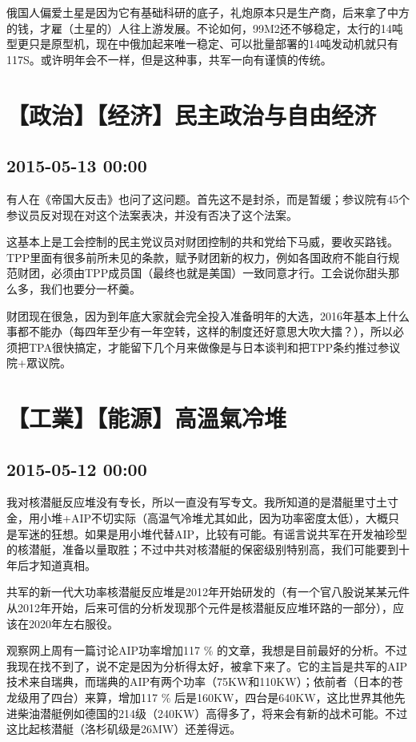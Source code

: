\documentclass[twocolumn]{ctexart}
\begin{document}
俄国人偏爱土星是因为它有基础科研的底子，礼炮原本只是生产商，后来拿了中方的钱，才雇（土星的）人往上游发展。不论如何，99M2还不够稳定，太行的14吨型更只是原型机，现在中俄加起来唯一稳定、可以批量部署的14吨发动机就只有117S。或许明年会不一样，但是这种事，共军一向有谨慎的传统。\section*{【政治】【经济】民主政治与自由经济}
\subsection*{2015-05-13 00:00}
有人在《帝国大反击》也问了这问题。首先这不是封杀，而是暂缓；参议院有45个参议员反对现在对这个法案表决，并没有否决了这个法案。

这基本上是工会控制的民主党议员对财团控制的共和党给下马威，要收买路钱。TPP里面有很多前所未见的条款，赋予财团新的权力，例如各国政府不能自行规范财团，必须由TPP成员国（最终也就是美国）一致同意才行。工会说你甜头那么多，我们也要分一杯羹。

财团现在很急，因为到年底大家就会完全投入准备明年的大选，2016年基本上什么事都不能办（每四年至少有一年空转，这样的制度还好意思大吹大擂？），所以必须把TPA很快搞定，才能留下几个月来做像是与日本谈判和把TPP条约推过参议院+眾议院。\section*{【工業】【能源】高溫氣冷堆}
\subsection*{2015-05-12 00:00}
我对核潜艇反应堆没有专长，所以一直没有写专文。我所知道的是潜艇里寸土寸金，用小堆+AIP不切实际（高温气冷堆尤其如此，因为功率密度太低），大概只是军迷的狂想。如果是用小堆代替AIP，比较有可能。有谣言说共军在开发袖珍型的核潜艇，准备以量取胜；不过中共对核潜艇的保密级别特别高，我们可能要到十年后才知道真相。

共军的新一代大功率核潜艇反应堆是2012年开始研发的（有一个官八股说某某元件从2012年开始，后来可信的分析发现那个元件是核潜艇反应堆环路的一部分），应该在2020年左右服役。

观察网上周有一篇讨论AIP功率增加117 \% 的文章，我想是目前最好的分析。不过我现在找不到了，说不定是因为分析得太好，被拿下来了。它的主旨是共军的AIP技术来自瑞典，而瑞典的AIP有两个功率（75KW和110KW）；依前者（日本的苍龙级用了四台）来算，增加117 \% 后是160KW，四台是640KW，这比世界其他先进柴油潜艇例如德国的214级（240KW）高得多了，将来会有新的战术可能。不过这比起核潜艇（洛杉矶级是26MW）还差得远。
\end{document}
